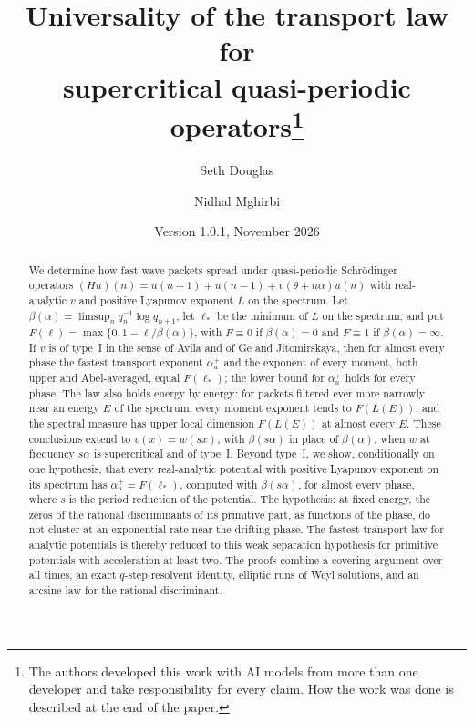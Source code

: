 \documentclass[11pt]{article}
\title{Universality of the transport law for\\ supercritical quasi-periodic operators\thanks{The authors developed this work with AI models from more than one developer and take responsibility for every claim. How the work was done is described at the end of the paper.}}
\author{Seth Douglas \and Nidhal Mghirbi}
\date{Version 1.0.1, November 2026}
\theoremstyle{definition}
\begin{document}
\maketitle
\begin{abstract}
We determine how fast wave packets spread under quasi-periodic Schr\"odinger operators $(Hu)(n)=u(n+1)+u(n-1)+v(\theta+n\alpha)u(n)$ with real-analytic $v$ and positive Lyapunov exponent $L$ on the spectrum. Let $\beta(\alpha)=\limsup_n q_n^{-1}\log q_{n+1}$, let $\ell_*$ be the minimum of $L$ on the spectrum, and put $F(\ell)=\max\{0,1-\ell/\beta(\alpha)\}$, with $F\equiv0$ if $\beta(\alpha)=0$ and $F\equiv1$ if $\beta(\alpha)=\infty$. If $v$ is of type~I in the sense of Avila and of Ge and Jitomirskaya, then for almost every phase the fastest transport exponent $\alpha_u^+$ and the exponent of every moment, both upper and Abel-averaged, equal $F(\ell_*)$; the lower bound for $\alpha_u^+$ holds for every phase. The law also holds energy by energy: for packets filtered ever more narrowly near an energy $E$ of the spectrum, every moment exponent tends to $F(L(E))$, and the spectral measure has upper local dimension $F(L(E))$ at almost every $E$. These conclusions extend to $v(x)=w(sx)$, with $\beta(s\alpha)$ in place of $\beta(\alpha)$, when $w$ at frequency $s\alpha$ is supercritical and of type~I. Beyond type~I, we show, conditionally on one hypothesis, that every real-analytic potential with positive Lyapunov exponent on its spectrum has $\alpha_u^+=F(\ell_*)$, computed with $\beta(s\alpha)$, for almost every phase, where $s$ is the period reduction of the potential. The hypothesis: at fixed energy, the zeros of the rational discriminants of its primitive part, as functions of the phase, do not cluster at an exponential rate near the drifting phase. The fastest-transport law for analytic potentials is thereby reduced to this weak separation hypothesis for primitive potentials with acceleration at least two. The proofs combine a covering argument over all times, an exact $q$-step resolvent identity, elliptic runs of Weyl solutions, and an arcsine law for the rational discriminant.
\end{abstract}

{\small\tableofcontents}












\end{document}
